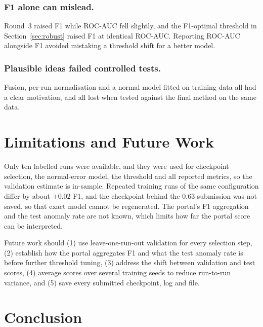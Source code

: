 \documentclass[runningheads]{llncs}
\begin{document}
\subsubsection{F1 alone can mislead.} Round~3 raised F1 while ROC-AUC fell slightly, and the F1-optimal threshold in Section~\ref{sec:robust} raised F1 at identical ROC-AUC. Reporting ROC-AUC alongside F1 avoided mistaking a threshold shift for a better model.

\subsubsection{Plausible ideas failed controlled tests.} Fusion, per-run normalisation and a normal model fitted on training data all had a clear motivation, and all lost when tested against the final method on the same data.

\section{Limitations and Future Work}

Only ten labelled runs were available, and they were used for checkpoint selection, the normal-error model, the threshold and all reported metrics, so the validation estimate is in-sample. Repeated training runs of the same configuration differ by about $\pm 0.02$ F1, and the checkpoint behind the 0.63 submission was not saved, so that exact model cannot be regenerated. The portal's F1 aggregation and the test anomaly rate are not known, which limits how far the portal score can be interpreted.

Future work should (1) use leave-one-run-out validation for every selection step, (2) establish how the portal aggregates F1 and what the test anomaly rate is before further threshold tuning, (3) address the shift between validation and test scores, (4) average scores over several training seeds to reduce run-to-run variance, and (5) save every submitted checkpoint, log and file.

\section{Conclusion}
\end{document}
